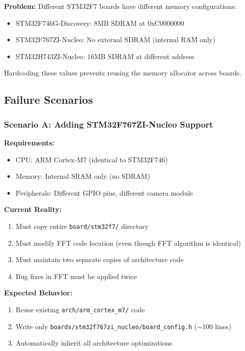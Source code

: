 \documentclass[11pt,a4paper]{article}
\begin{document}
\textbf{Problem:} Different STM32F7 boards have different memory configurations:
\begin{itemize}
    \item STM32F746G-Discovery: 8MB SDRAM at 0xC0000000
    \item STM32F767ZI-Nucleo: No external SDRAM (internal RAM only)
    \item STM32H743ZI-Nucleo: 16MB SDRAM at different address
\end{itemize}

Hardcoding these values prevents reusing the memory allocator across boards.

\subsection{Failure Scenarios}

\subsubsection{Scenario A: Adding STM32F767ZI-Nucleo Support}

\textbf{Requirements:}
\begin{itemize}
    \item CPU: ARM Cortex-M7 (identical to STM32F746)
    \item Memory: Internal SRAM only (no SDRAM)
    \item Peripherals: Different GPIO pins, different camera module
\end{itemize}

\textbf{Current Reality:}
\begin{enumerate}
    \item Must copy entire \texttt{board/stm32f7/} directory
    \item Must modify FFT code location (even though FFT algorithm is identical)
    \item Must maintain two separate copies of architecture code
    \item Bug fixes in FFT must be applied twice
\end{enumerate}

\textbf{Expected Behavior:}
\begin{enumerate}
    \item Reuse existing \texttt{arch/arm\_cortex\_m7/} code
    \item Write only \texttt{boards/stm32f767zi\_nucleo/board\_config.h} ($\sim$100 lines)
    \item Automatically inherit all architecture optimizations
\end{enumerate}
\end{document}
